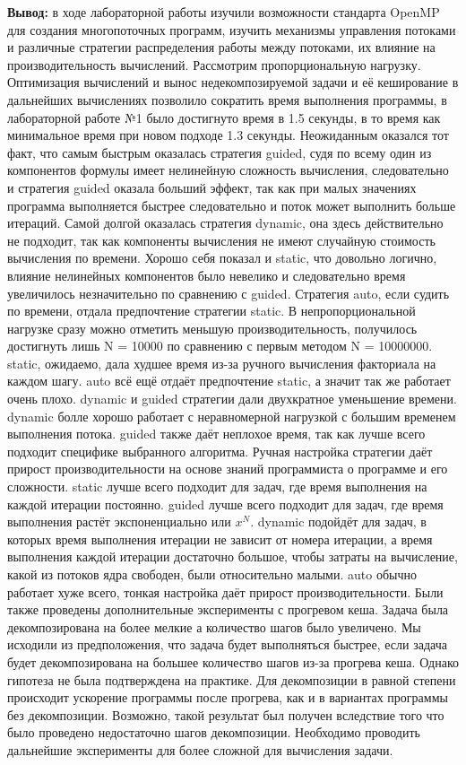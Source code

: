 \documentclass[a4paper,14pt]{extarticle}
\begin{document}
\textbf{Вывод: } в ходе лабораторной работы изучили возможности стандарта OpenMP для создания многопоточных
программ, изучить механизмы управления потоками и различные стратегии распределения
работы между потоками, их влияние на производительность вычислений. Рассмотрим пропорциональную нагрузку.
Оптимизация вычислений и вынос
недекомпозируемой задачи и её кеширование в дальнейших вычислениях позволило сократить время выполнения программы, 
в лабораторной работе №1 было достигнуто время в 1.5 секунды, в то время как минимальное время при новом подходе
1.3 секунды. Неожиданным оказался тот факт, что самым быстрым оказалась стратегия guided, судя по всему один из компонентов
формулы имеет нелинейную сложность вычисления, следовательно и стратегия guided оказала больший эффект, так как 
при малых значениях программа выполняется быстрее следовательно и поток может выполнить больше итераций. 
Самой долгой оказалась стратегия dynamic, она здесь действительно не подходит, так как компоненты вычисления
не имеют случайную стоимость вычисления по времени. Хорошо себя показал и static, что довольно логично, 
влияние нелинейных компонентов было невелико и следовательно время увеличилось незначительно по сравнению с 
guided. Стратегия auto, если судить по времени, отдала предпочтение стратегии static. 
В непропорциональной нагрузке сразу можно отметить меньшую производительность, получилось достигнуть лишь N = 10000
по сравнению с первым методом N = 10000000. static, ожидаемо, дала худшее время из-за ручного вычисления
факториала на каждом шагу. auto всё ещё отдаёт предпочтение static, а значит так же работает
очень плохо. dynamic и guided стратегии дали двухкратное уменьшение времени. dynamic болле хорошо 
работает с неравномерной нагрузкой с большим временем выполнения потока. guided также даёт неплохое время, 
так как лучше всего подходит специфике выбранного алгоритма.
Ручная настройка стратегии даёт прирост производительности на основе знаний программиста о программе и его сложности.
static лучше всего подходит для задач, где время выполнения на каждой итерации постоянно.
guided лучше всего подходит для задач, где время выполнения растёт экспоненциально или $x^N$. 
dynamic подойдёт для задач, в которых время выполнения итерации не зависит от номера итерации, а время выполнения каждой итерации
достаточно большое, чтобы затраты на вычисление, какой из потоков ядра свободен, были относительно малыми.
auto обычно работает хуже всего, тонкая настройка даёт прирост производительности.
Были также проведены дополнительные эксперименты с прогревом кеша. Задача была декомпозирована на более мелкие а 
количество шагов было увеличено. Мы исходили из предположения, что задача будет выполняться быстрее, если задача будет
декомпозирована на большее количество шагов из-за прогрева кеша. Однако гипотеза не была подтверждена на практике. 
Для декомпозиции в равной степени происходит ускорение программы после прогрева, как и в вариантах программы без
декомпозиции. Возможно, такой результат был получен вследствие того что было проведено недостаточно шагов декомпозиции.
Необходимо проводить дальнейшие эксперименты для более сложной для вычисления задачи. 
\end{document}
